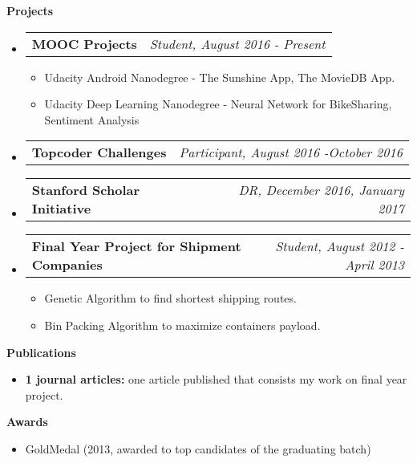 \documentclass[letterpaper,11pt]{article}
\makeatletter
\newcommand{\resheading}[1]{{\large \colorbox{mygrey}{\begin{minipage}{\textwidth}{\textbf{#1 \vphantom{p\^{E}}}}\end{minipage}}}}
\newcommand{\ressubheading}[4]{
\begin{tabular*}{7.0in}{l@{\extracolsep{\fill}}r}
		\textbf{#1} & \textit{#4} \\
\end{tabular*}\vspace{-6pt}}
\makeatother
\begin{document}
\resheading{Projects}
\begin{itemize}
\item
	\ressubheading{MOOC Projects}{Online}{Crowdsourcing}{Student, August 2016 - Present}
	\begin{itemize}
	\item Udacity Android Nanodegree - The Sunshine App, The MovieDB App.
	\item Udacity Deep Learning Nanodegree - Neural Network for BikeSharing, Sentiment Analysis
	\end{itemize}
\item
	\ressubheading{Topcoder Challenges}{Online}{Crowdsourcing}{Participant, August 2016 -October 2016}
\item
	\ressubheading{Stanford Scholar Initiative}{Online}{Crowdsourcing}{DR, December 2016, January 2017}	
\item
	\ressubheading{Final Year Project for Shipment Companies}{APIIT,IN}{Student}{Student, August 2012 - April 2013}
	\begin{itemize}
	\item Genetic Algorithm to find shortest shipping routes.
	\item Bin Packing Algorithm to maximize containers payload.
	\end{itemize}
\end{itemize}



\resheading{Publications}
\begin{itemize}
	\item {\bf 1 journal articles:} one article published that consists my work on final year project.
\end{itemize}

\resheading{Awards}
\begin{itemize}
	\item GoldMedal (2013, awarded to top candidates of the graduating batch)
\end{itemize}
\end{document}
